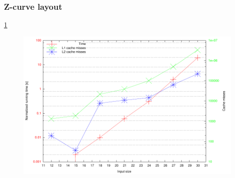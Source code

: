 \subsubsection{Z-curve layout}

\ref{fig:zrzrzr0}

\begin{figure}[h!]
  \centering
  \includegraphics[width=\textwidth]{zrzrzr0.pdf}
  \label{fig:zrzrzr0}
\end{figure}